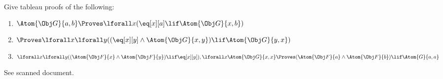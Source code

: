 \documentclass[../../../../include/open-logic-section]{subfiles}
\begin{document}


\begin{prob}
Give tableau proofs of the following:
\begin{enumerate}
	\item $\Atom{\Obj G}{a,b}\Proves \lforall x(\eq[x][a]\lif \Atom{\Obj G}{x,b})$
	\item $\Proves \lforall x\lforall y((\eq[x][y] \land \Atom{\Obj G}{x,y}) \lif \Atom{\Obj G}{y,x})$
	\item $\lforall x\lforall y ((\Atom{\Obj F}{x}\land\Atom{\Obj F}{y})\lif \eq[x][y]), 
	\lforall x\Atom{\Obj G}{x,x} \Proves (\Atom{\Obj F}{a} \land \Atom{\Obj F}{b}) \lif \Atom{G}{a,a}$ %
\end{enumerate}
\begin{ans}
See scanned document. 
\end{ans}
\end{prob}
\end{document}
